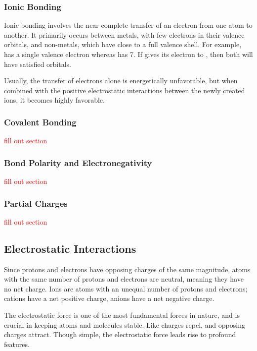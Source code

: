 \subsubsection{Ionic Bonding}

Ionic bonding involves the near complete transfer of an electron from one atom to another. It primarily occurs between metals, with few electrons in their valence orbitals, and non-metals, which have close to a full valence shell. For example,  has a single valence electron whereas  has 7. If  gives its electron to , then both will have satisfied orbitals.

Usually, the transfer of electrons alone is energetically unfavorable, but when combined with the positive electrostatic interactions between the newly created ions, it becomes highly favorable.

\subsubsection{Covalent Bonding}

\textcolor{red}{fill out section}

\subsubsection{Bond Polarity and Electronegativity}

\textcolor{red}{fill out section}

\subsubsection{Partial Charges}

\textcolor{red}{fill out section}

\subsection{Electrostatic Interactions}

Since protons and electrons have opposing charges of the same magnitude, atoms with the same number of protons and electrons are neutral, meaning they have no net charge. Ions are atoms with an unequal number of protons and electrons; cations have a net positive charge, anions have a net negative charge.

The electrostatic force is one of the most fundamental forces in nature, and is crucial in keeping atoms and molecules stable. Like charges repel, and opposing charges attract. Though simple, the electrostatic force leads rise to profound features.

